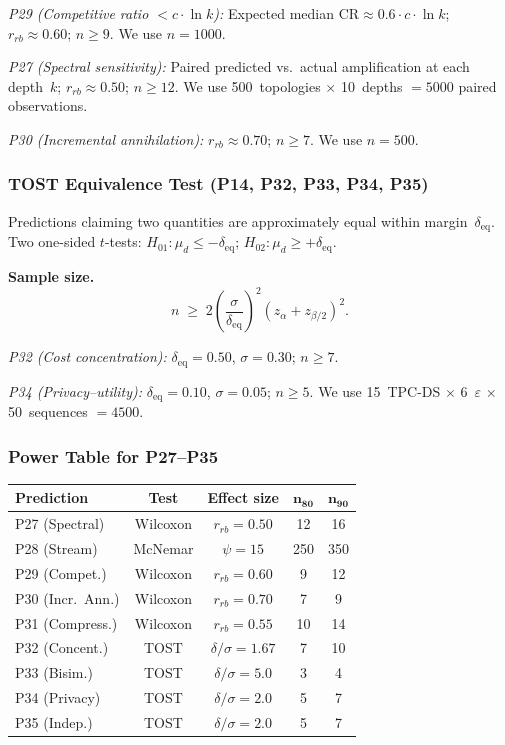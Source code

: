 \documentclass[11pt,a4paper]{article}
\theoremstyle{definition}
\begin{document}
\emph{P29 (Competitive ratio $< c \cdot \ln k$):}
Expected median $\mathrm{CR} \approx 0.6 \cdot c \cdot \ln k$;
$r_{rb} \approx 0.60$; $n \geq 9$.  We use $n = 1000$.

\emph{P27 (Spectral sensitivity):}
Paired predicted vs.\ actual amplification at each depth~$k$;
$r_{rb} \approx 0.50$; $n \geq 12$.
We use 500~topologies $\times$ 10~depths $= 5000$ paired observations.

\emph{P30 (Incremental annihilation):}
$r_{rb} \approx 0.70$; $n \geq 7$.  We use $n = 500$.

\subsubsection{TOST Equivalence Test (P14, P32, P33, P34, P35)}

Predictions claiming two quantities are approximately equal within
margin~$\delta_{\mathrm{eq}}$.  Two one-sided $t$-tests:
$H_{01}\!: \mu_d \leq -\delta_{\mathrm{eq}}$;
$H_{02}\!: \mu_d \geq +\delta_{\mathrm{eq}}$.

\textbf{Sample size.}
\[
  n \;\geq\; 2\!\left(\frac{\sigma}{\delta_{\mathrm{eq}}}\right)^{\!2}
  (z_\alpha + z_{\beta/2})^2.
\]

\emph{P32 (Cost concentration):}
$\delta_{\mathrm{eq}} = 0.50$, $\sigma = 0.30$; $n \geq 7$.

\emph{P34 (Privacy--utility):}
$\delta_{\mathrm{eq}} = 0.10$, $\sigma = 0.05$; $n \geq 5$.
We use 15~TPC-DS $\times$ 6~$\varepsilon$ $\times$ 50~sequences $= 4500$.

\subsubsection{Power Table for P27--P35}

\begin{center}
\begin{tabular}{lcccc}
\toprule
\textbf{Prediction} & \textbf{Test} & \textbf{Effect size}
  & $\boldsymbol{n_{80}}$ & $\boldsymbol{n_{90}}$ \\
\midrule
P27 (Spectral)     & Wilcoxon & $r_{rb}=0.50$ & 12  & 16  \\
P28 (Stream)       & McNemar  & $\psi = 15$   & 250 & 350 \\
P29 (Compet.)      & Wilcoxon & $r_{rb}=0.60$ & 9   & 12  \\
P30 (Incr.~Ann.)   & Wilcoxon & $r_{rb}=0.70$ & 7   & 9   \\
P31 (Compress.)    & Wilcoxon & $r_{rb}=0.55$ & 10  & 14  \\
P32 (Concent.)     & TOST & $\delta/\sigma=1.67$ & 7  & 10 \\
P33 (Bisim.)       & TOST & $\delta/\sigma=5.0$  & 3  & 4  \\
P34 (Privacy)      & TOST & $\delta/\sigma=2.0$  & 5  & 7  \\
P35 (Indep.)       & TOST & $\delta/\sigma=2.0$  & 5  & 7  \\
\bottomrule
\end{tabular}
\end{center}
\end{document}
